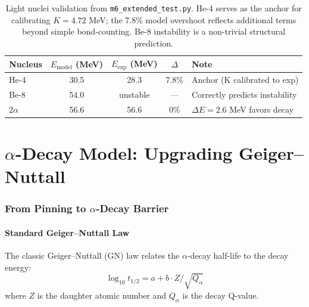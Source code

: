 \documentclass[11pt,a4paper]{article}
\begin{document}
\begin{table}[h]
\centering
\begin{tabular}{lcccl}
\toprule
\textbf{Nucleus} & \textbf{$E_{\text{model}}$ (MeV)} & \textbf{$E_{\text{exp}}$ (MeV)} & \textbf{$\Delta$} & \textbf{Note} \\
\midrule
He-4 & 30.5 & 28.3 & 7.8\% & Anchor (K calibrated to exp) \\
Be-8 & 54.0 & unstable & --- & Correctly predicts instability \\
$2\alpha$ & 56.6 & 56.6 & 0\% & $\Delta E = 2.6$ MeV favors decay \\
\bottomrule
\end{tabular}
\caption{Light nuclei validation from \texttt{m6\_extended\_test.py}. He-4 serves as the anchor for calibrating $K = 4.72$ MeV; the 7.8\% model overshoot reflects additional terms beyond simple bond-counting. Be-8 instability is a non-trivial structural prediction.}
\label{tab:light_nuclei}
\end{table}

\newpage


\part{$\alpha$-Decay Model: Upgrading Geiger--Nuttall}

\section{From Pinning to $\alpha$-Decay Barrier}
\label{sec:alpha_barrier}

\subsection{Standard Geiger--Nuttall Law}

The classic Geiger--Nuttall (GN) law relates the $\alpha$-decay half-life to the decay energy:
\begin{equation}
    \log_{10} t_{1/2} = a + b \cdot Z / \sqrt{Q_\alpha}
    \label{eq:gn_standard}
\end{equation}
where $Z$ is the daughter atomic number and $Q_\alpha$ is the decay Q-value.
\end{document}
